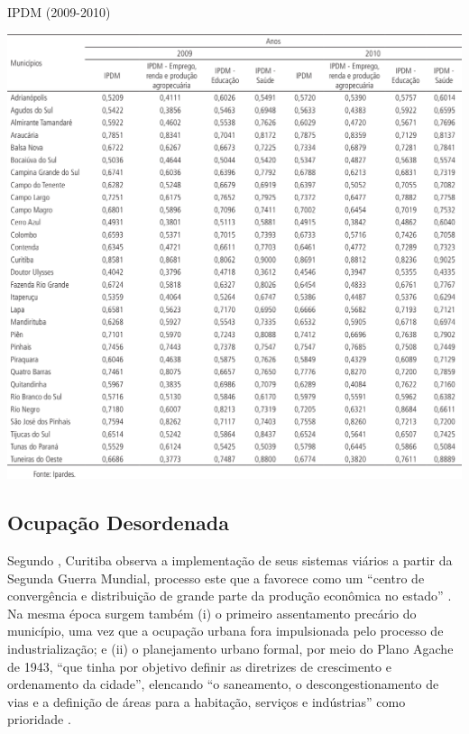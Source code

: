 	\begin{table}
		\centering
		\caption{IPDM (2009-2010)}
		\includegraphics[width=1.0\linewidth]{img/costa2015a_09}
		\label{tab:costa2015a_09}
	\end{table}
	
	\subsection{Ocupação Desordenada}
	
	Segundo , Curitiba observa a implementação de seus sistemas viários a partir da Segunda Guerra Mundial, processo este que a favorece como um ``centro de convergência e distribuição de grande parte da produção econômica no estado'' . Na mesma época surgem também (i) o primeiro assentamento precário do município, uma vez que a ocupação urbana fora impulsionada pelo processo de industrialização; e (ii) o planejamento urbano formal, por meio do Plano Agache de 1943, ``que tinha por objetivo definir as diretrizes de crescimento e ordenamento da cidade'', elencando ``o saneamento, o descongestionamento de vias e a definição de áreas para a habitação, serviços e indústrias'' como prioridade \cite[p. 52]{castro2005a}.
	
